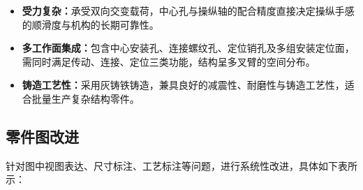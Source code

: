 \documentclass[12pt,a4paper,fontset=none]{ctexart}
\begin{document}
    \begin{itemize}
        \item \textbf{受力复杂：}承受双向交变载荷，中心孔与操纵轴的配合精度直接决定操纵手感的顺滑度与机构的长期可靠性。
        \item \textbf{多工作面集成：}包含中心安装孔、连接螺纹孔、定位销孔及多组安装定位面，需同时满足传动、连接、定位三类功能，结构呈多叉臂的空间分布。
        \item \textbf{铸造工艺性：}采用灰铸铁铸造，兼具良好的减震性、耐磨性与铸造工艺性，适合批量生产复杂结构零件。
    \end{itemize}

    \subsection{零件图改进}

    针对图中视图表达、尺寸标注、工艺标注等问题，进行系统性改进，具体如下表所示：
\end{document}
